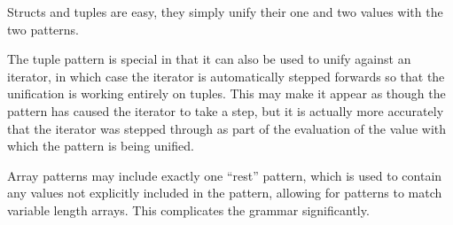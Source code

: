 Structs and tuples are easy, they simply unify their one and two values with
the two patterns.

The tuple pattern is special in that it can also be used to unify against
an iterator, in which case the iterator is automatically stepped forwards
so that the unification is working entirely on tuples. This may make it
appear as though the pattern has caused the iterator to take a step, but it
is actually more accurately that the iterator was stepped through as part
of the evaluation of the value with which the pattern is being unified.

\begin{prooftree}
\end{prooftree}

\begin{prooftree}
\end{prooftree}

Array patterns may include exactly one ``rest'' pattern, which is used to
contain any values not explicitly included in the pattern, allowing for
patterns to match variable length arrays. This complicates the grammar
significantly.

\begin{bnf*}
     \\
     \\
     \\
     \\
     \\
     \\
\end{bnf*}

